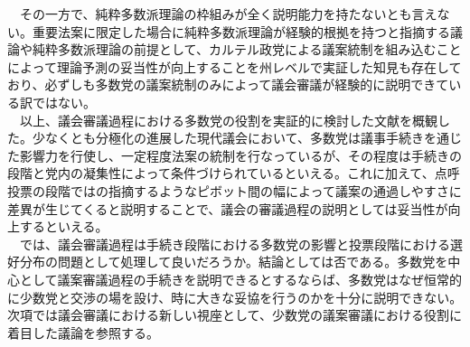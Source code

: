 \documentclass{article}
\begin{document}
　その一方で、純粋多数派理論の枠組みが全く説明能力を持たないとも言えない。重要法案に限定した場合に純粋多数派理論が経験的根拠を持つと指摘する議論\citep*{Gray2019-sv}や純粋多数派理論の前提として、カルテル政党による議案統制を組み込むことによって理論予測の妥当性が向上することを州レベルで実証した知見\citep*{Crosson2019-xb}も存在しており、必ずしも多数党の議案統制のみによって議会審議が経験的に説明できている訳ではない。\\
　以上、議会審議過程における多数党の役割を実証的に検討した文献を概観した。少なくとも分極化の進展した現代議会において、多数党は議事手続きを通じた影響力を行使し、一定程度法案の統制を行なっているが、その程度は手続きの段階と党内の凝集性によって条件づけられているといえる。これに加えて、点呼投票の段階では\citet*{Krehbiel1998-ob,Krehbiel2010-ob}の指摘するようなピボット間の幅によって議案の通過しやすさに差異が生じてくると説明することで、議会の審議過程の説明としては妥当性が向上するといえる。\\
　では、議会審議過程は手続き段階における多数党の影響と投票段階における選好分布の問題として処理して良いだろうか。結論としては否である。多数党を中心として議案審議過程の手続きを説明できるとするならば、多数党はなぜ恒常的に少数党と交渉の場を設け、時に大きな妥協を行うのかを十分に説明できない。次項では議会審議における新しい視座として、少数党の議案審議における役割に着目した議論を参照する。\\
\end{document}
